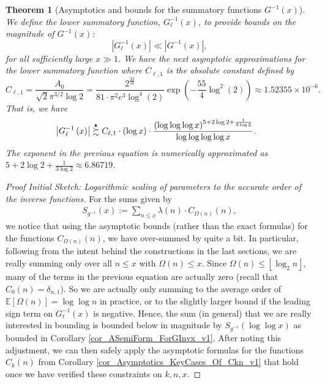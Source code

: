 \documentclass[11pt,reqno,a4letter]{article}
\numberwithin{figure}{section}
\numberwithin{table}{section}
\newcommand{\floor}[1]{\left\lfloor #1 \right\rfloor}
\theoremstyle{plain}
\newtheorem{theorem}{Theorem}
\numberwithin{theorem}{section}
\theoremstyle{definition}
\newcommand{\SuccSim}[0]{\overset{_{\scriptsize{\blacktriangle}}}{\succsim}}
\begin{document}
\begin{theorem}[Asymptotics and bounds for the summatory functions $G^{-1}(x)$] 
\label{theorem_gInv_GeneralAsymptoticsForms}
We define the lower summatory function, $G_{\ell}^{-1}(x)$, 
to provide bounds on the magnitude of $G^{-1}(x)$: 
$$|G_{\ell}^{-1}(x)| \ll |G^{-1}(x)|,$$ for all sufficiently large $x \gg 1$. 
We have the next asymptotic approximations for the lower summatory function where 
$C_{\ell,1}$ is the absolute constant defined by 
\[
C_{\ell,1} = \frac{A_0}{\sqrt{2} \pi^{3/2} \log 2} = 
     \frac{2^{\frac{33}{16}}}{81 \cdot \pi^2 e^3 \log^4(2)} \exp\left(-\frac{55}{4} \log^2(2)\right) 
     \approx 1.52355 \times 10^{-6}.
\]
That is, we have 
\begin{align*} 
 & \left\lvert G_{\ell}^{-1}\left(x\right) \right\rvert
     \SuccSim 
     C_{\ell,1} \cdot (\log x) \cdot 
     \frac{(\log\log\log x)^{5 + 2\log 2 + \frac{1}{3\log 2}}}{ 
     \log\log\log\log x}. 
\end{align*} 
The exponent in the previous equation is numerically approximated as 
$5 + 2\log 2 + \frac{1}{3\log 2} \approx 6.86719$. 
\end{theorem} 
\begin{proof}[Proof Initial Sketch: Logarithmic scaling of parameters to the accurate order of the inverse functions] 
For the sums given by 
\begin{align*} 
S_{g^{-1}}(x) := \sum_{n \leq x} \lambda(n) \cdot C_{\Omega(n)}(n), 
\end{align*} 
we notice that using the asymptotic bounds (rather than the exact formulas) for the functions 
$C_{\Omega(n)}(n)$, we have over-summed by quite a bit. 
In particular, following from the intent behind the constructions in the last sections, 
we are really summing only over all $n \leq x$ with $\Omega(n) \leq x$. 
Since $\Omega(n) \leq \floor{\log_2 n}$, 
many of the terms in the previous equation are actually zero (recall that $C_0(n) = \delta_{n,1}$). 
So we are actually only summing to the average order of 
$\mathbb{E}[\Omega(n)] = \log\log n$ in practice, or to the slightly larger bound if the leading sign term on 
$G_{\ell}^{-1}(x)$ is negative. 
Hence, the sum (in general) that we are really interested in bounding is 
bounded below in magnitude by $S_{g^{-1}}(\log\log x)$ as bounded in 
Corollary \ref{cor_ASemiForm_ForGInvx_v1}. After noting this adjustment, 
we can then safely apply the 
asymptotic formulas for the functions $C_k(n)$ from 
Corollary \ref{cor_Asymptotics_KeyCases_Of_Ckn_v1} 
that hold once we have verified these constraints on $k,n,x$. 
\end{proof} 
\end{document}
